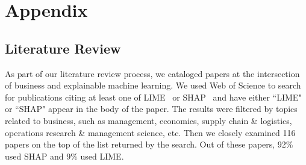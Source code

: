 \documentclass[mnsc,blindrev]{informs3}
\begin{document}






\newpage

\section{Appendix}
    \subsection{Literature Review}
        As part of our literature review process, we cataloged papers at the intersection of business and explainable machine learning. We used Web of Science to search for publications citing at least one of LIME~\citep{ribeiro16lime} or SHAP~\citep{lundberg17shap} and have either ``LIME" or ``SHAP" appear in the body of the paper.  The results were filtered by topics related to business, such as management, economics, supply chain \& logistics, operations research \& management science, etc. Then we closely examined 116 papers on the top of the list returned by the search. Out of these papers, 92\% used SHAP and 9\% used LIME. %
\end{document}
